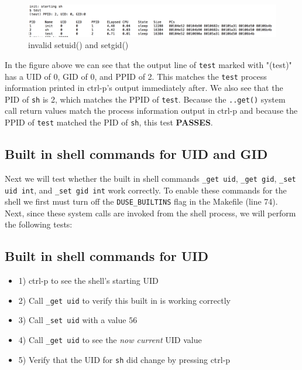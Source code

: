 \documentclass[11pt,letterpaper]{report}
\begin{document}
\begin{figure}[h!]
\centering
\includegraphics[width=0.8\linewidth]{test-all-get.png}
\caption[invalid setuid() and setgid()]{invalid setuid() and setgid()}
\label{fig:datetest}
\end{figure}

	In the figure above we can see that the output line of {\tt test} marked with "(test)" has a UID of 0, GID of 0, and PPID of 2. This matches the {\tt test} process information
	printed in ctrl-p's output immediately after. We also see that the PID of {\tt sh} is 2, which matches the PPID of {\tt test}. Because the {\tt ..get()} system call return values 
	match the process information output in ctrl-p and because the PPID of {\tt test} matched the PID of {\tt sh}, this test \textbf{PASSES}.


\newpage 

\subsection*{Built in shell commands for UID and GID}
	Next we will test whether the built in shell commands {\tt \_get uid}, {\tt \_get gid}, {\tt \_set uid int}, and {\tt \_set gid int} work correctly. To enable these commands for the shell
	we first must turn off the {\tt DUSE\_BUILTINS} flag in the Makefile (line 74). Next, since these system calls are invoked from the shell process, we will perform the following tests:

\subsection*{Built in shell commands for UID}	
	\begin{itemize}
			\item 1) ctrl-p to see the shell's starting UID
				
			\item 2) Call {\tt \_get uid} to verify this built in is working correctly
			
			\item 3) Call {\tt \_set uid} with a value $56$
			
			\item 4) Call {\tt \_get uid} to see the \emph{now current} UID value
			
			\item 5) Verify that the UID for {\tt sh} did change by pressing ctrl-p

	\end{itemize}
	
\end{document}
